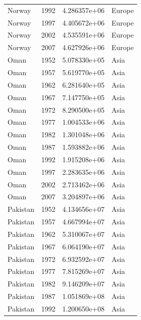 \documentclass[
  letterpaper,
  DIV=11,
  numbers=noendperiod]{scrreprt}
\begin{document}
\begin{tcolorbox}
\begin{tabular}{lrrl}
Norway                   &  1992 &  4.286357e+06 &    Europe \\
Norway                   &  1997 &  4.405672e+06 &    Europe \\
Norway                   &  2002 &  4.535591e+06 &    Europe \\
Norway                   &  2007 &  4.627926e+06 &    Europe \\
Oman                     &  1952 &  5.078330e+05 &      Asia \\
Oman                     &  1957 &  5.619770e+05 &      Asia \\
Oman                     &  1962 &  6.281640e+05 &      Asia \\
Oman                     &  1967 &  7.147750e+05 &      Asia \\
Oman                     &  1972 &  8.290500e+05 &      Asia \\
Oman                     &  1977 &  1.004533e+06 &      Asia \\
Oman                     &  1982 &  1.301048e+06 &      Asia \\
Oman                     &  1987 &  1.593882e+06 &      Asia \\
Oman                     &  1992 &  1.915208e+06 &      Asia \\
Oman                     &  1997 &  2.283635e+06 &      Asia \\
Oman                     &  2002 &  2.713462e+06 &      Asia \\
Oman                     &  2007 &  3.204897e+06 &      Asia \\
Pakistan                 &  1952 &  4.134656e+07 &      Asia \\
Pakistan                 &  1957 &  4.667994e+07 &      Asia \\
Pakistan                 &  1962 &  5.310067e+07 &      Asia \\
Pakistan                 &  1967 &  6.064190e+07 &      Asia \\
Pakistan                 &  1972 &  6.932592e+07 &      Asia \\
Pakistan                 &  1977 &  7.815269e+07 &      Asia \\
Pakistan                 &  1982 &  9.146209e+07 &      Asia \\
Pakistan                 &  1987 &  1.051869e+08 &      Asia \\
Pakistan                 &  1992 &  1.200650e+08 &      Asia \\

\end{tabular}
\end{tcolorbox}
\end{document}

